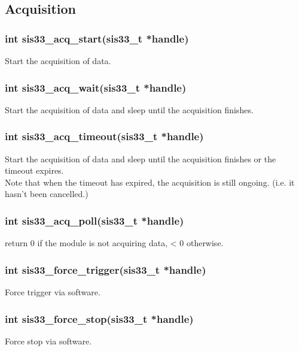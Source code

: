 \documentclass[12pt,a4paper]{article}
\begin{document}
\subsection*{Acquisition}
\label{sec-2.4}


\subsubsection*{int sis33\_acq\_start(sis33\_t *handle)}
\label{sec-2.4.1}

Start the acquisition of data.

\subsubsection*{int sis33\_acq\_wait(sis33\_t *handle)}
\label{sec-2.4.2}

Start the acquisition of data and sleep until the acquisition finishes.

\subsubsection*{int sis33\_acq\_timeout(sis33\_t *handle)}
\label{sec-2.4.3}

Start the acquisition of data and sleep until the acquisition finishes
or the timeout expires. \\
Note that when the timeout has expired, the acquisition is still ongoing.
(i.e. it hasn't been cancelled.)

\subsubsection*{int sis33\_acq\_poll(sis33\_t *handle)}
\label{sec-2.4.4}

return 0 if the module is not acquiring data, < 0 otherwise.

\subsubsection*{int sis33\_force\_trigger(sis33\_t *handle)}
\label{sec-2.4.5}

Force trigger via software.

\subsubsection*{int sis33\_force\_stop(sis33\_t *handle)}
\label{sec-2.4.6}

Force stop via software.
\end{document}
